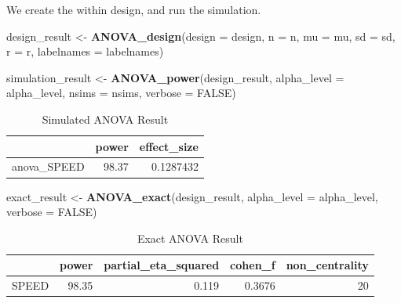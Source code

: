 \documentclass[]{book}
\newenvironment{Shaded}{\begin{snugshade}}{\end{snugshade}}
\newcommand{\DataTypeTok}[1]{\textcolor[rgb]{0.13,0.29,0.53}{#1}}
\newcommand{\KeywordTok}[1]{\textcolor[rgb]{0.13,0.29,0.53}{\textbf{#1}}}
\newcommand{\NormalTok}[1]{#1}
\newcommand{\OtherTok}[1]{\textcolor[rgb]{0.56,0.35,0.01}{#1}}
\newcommand{\StringTok}[1]{\textcolor[rgb]{0.31,0.60,0.02}{#1}}
\begin{document}
We create the within design, and run the simulation.

\begin{Shaded}
\begin{Highlighting}[]
\NormalTok{design_result <-}\StringTok{ }\KeywordTok{ANOVA_design}\NormalTok{(}\DataTypeTok{design =}\NormalTok{ design,}
                   \DataTypeTok{n =}\NormalTok{ n, }
                   \DataTypeTok{mu =}\NormalTok{ mu, }
                   \DataTypeTok{sd =}\NormalTok{ sd, }
                   \DataTypeTok{r =}\NormalTok{ r, }
                   \DataTypeTok{labelnames =}\NormalTok{ labelnames)}
\end{Highlighting}
\end{Shaded}

\begin{Shaded}
\begin{Highlighting}[]
\NormalTok{simulation_result <-}\StringTok{ }\KeywordTok{ANOVA_power}\NormalTok{(design_result, }
                                 \DataTypeTok{alpha_level =}\NormalTok{ alpha_level, }
                                 \DataTypeTok{nsims =}\NormalTok{ nsims,}
                                 \DataTypeTok{verbose =} \OtherTok{FALSE}\NormalTok{)}
\end{Highlighting}
\end{Shaded}

\begin{table}[t]

\caption{\label{tab:unnamed-chunk-129}Simulated ANOVA Result}
\centering
\begin{tabular}{l|r|r}
\hline
  & power & effect\_size\\
\hline
anova\_SPEED & 98.37 & 0.1287432\\
\hline
\end{tabular}
\end{table}

\begin{Shaded}
\begin{Highlighting}[]
\NormalTok{exact_result <-}\StringTok{ }\KeywordTok{ANOVA_exact}\NormalTok{(design_result,}
                            \DataTypeTok{alpha_level =}\NormalTok{ alpha_level,}
                            \DataTypeTok{verbose =} \OtherTok{FALSE}\NormalTok{)}
\end{Highlighting}
\end{Shaded}

\begin{table}[t]

\caption{\label{tab:unnamed-chunk-131}Exact ANOVA Result}
\centering
\begin{tabular}{l|r|r|r|r}
\hline
  & power & partial\_eta\_squared & cohen\_f & non\_centrality\\
\hline
SPEED & 98.35 & 0.119 & 0.3676 & 20\\
\hline
\end{tabular}
\end{table}
\end{document}
